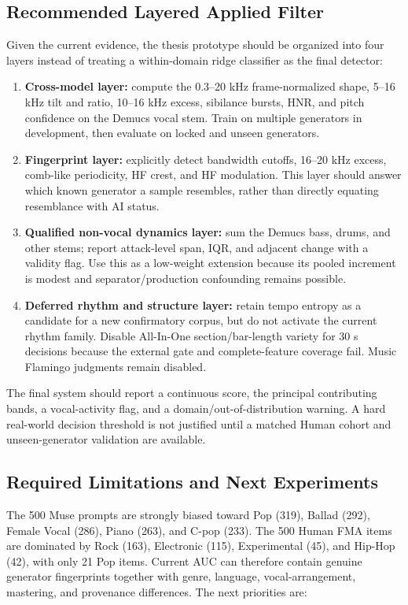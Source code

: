 \documentclass[11pt,a4paper]{article}
\begin{document}
\subsection{Recommended Layered Applied Filter}

Given the current evidence, the thesis prototype should be organized into four layers instead of treating a within-domain ridge classifier as the final detector:

\begin{enumerate}
  \item \textbf{Cross-model layer:} compute the 0.3--20 kHz frame-normalized shape, 5--16 kHz tilt and ratio, 10--16 kHz excess, sibilance bursts, HNR, and pitch confidence on the Demucs vocal stem. Train on multiple generators in development, then evaluate on locked and unseen generators.
  \item \textbf{Fingerprint layer:} explicitly detect bandwidth cutoffs, 16--20 kHz excess, comb-like periodicity, HF crest, and HF modulation. This layer should answer which known generator a sample resembles, rather than directly equating resemblance with AI status.
  \item \textbf{Qualified non-vocal dynamics layer:} sum the Demucs bass, drums, and other stems; report attack-level span, IQR, and adjacent change with a validity flag. Use this as a low-weight extension because its pooled increment is modest and separator/production confounding remains possible.
  \item \textbf{Deferred rhythm and structure layer:} retain tempo entropy as a candidate for a new confirmatory corpus, but do not activate the current rhythm family. Disable All-In-One section/bar-length variety for 30 s decisions because the external gate and complete-feature coverage fail. Music Flamingo judgments remain disabled.
\end{enumerate}

The final system should report a continuous score, the principal contributing bands, a vocal-activity flag, and a domain/out-of-distribution warning. A hard real-world decision threshold is not justified until a matched Human cohort and unseen-generator validation are available.

\subsection{Required Limitations and Next Experiments}

The 500 Muse prompts are strongly biased toward Pop (319), Ballad (292), Female Vocal (286), Piano (263), and C-pop (233). The 500 Human FMA items are dominated by Rock (163), Electronic (115), Experimental (45), and Hip-Hop (42), with only 21 Pop items. Current AUC can therefore contain genuine generator fingerprints together with genre, language, vocal-arrangement, mastering, and provenance differences. The next priorities are:
\end{document}
